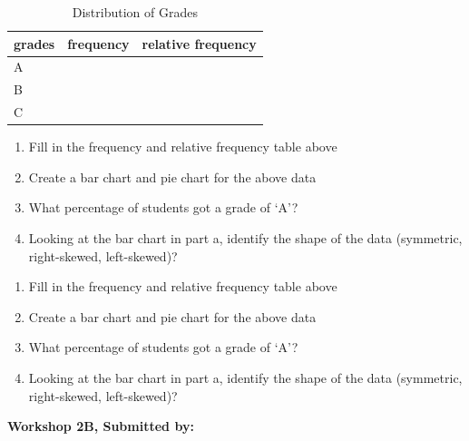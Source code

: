 \documentclass[11pt, chapterprefix=true]{scrbook}\usepackage[]{graphicx}\usepackage[]{color}
\begin{document}
\begin{exercises}
\begin{exercise}
\begin{table}[ht]
\centering
\caption{Distribution of Grades}
\begin{tabular}{@{} lcc @{}} \hline
grades & frequency & relative frequency \\ \hline
A  & & \\
B  & & \\
C  & & \\ \hline
\end{tabular}
\end{table}
    
\begin{enumerate}
  \item Fill in the frequency and relative frequency table above
  \item  Create a bar chart and pie chart for the above data
  \item  What percentage of students got a grade of `A'?
  \item  Looking at the bar chart in part a, identify the shape of the data (symmetric, right-skewed, left-skewed)? 
\end{enumerate}
    \end{exercise}
    \begin{solution}  %
      
  \begin{enumerate}
  \item Fill in the frequency and relative frequency table above
  \item  Create a bar chart and pie chart for the above data
  \item  What percentage of students got a grade of `A'?
  \item  Looking at the bar chart in part a, identify the shape of the data (symmetric, right-skewed, left-skewed)? 
\end{enumerate}
    \end{solution}

\clearpage

    \begin{exercise}  %

    \begin{center}
\begin{flushleft}\textbf{\large \hfill Workshop 2B, Submitted by: }\end{flushleft}

\end{center}
\end{exercise}
\end{exercises}
\end{document}
